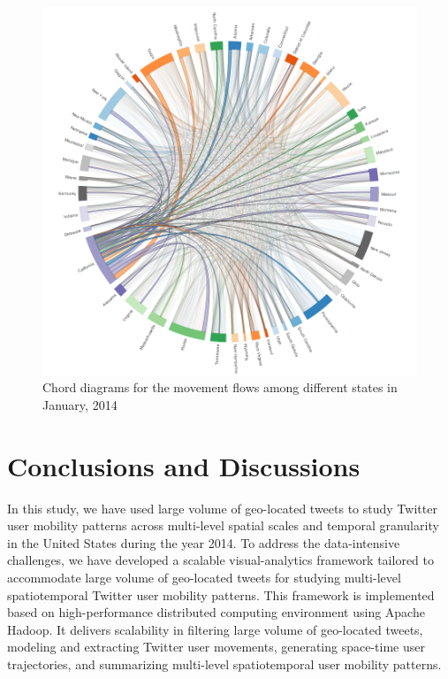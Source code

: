 \documentclass[a4paper, 11pt]{article}
\begin{document}
\begin{figure}[h]
\centering
\includegraphics[width=0.9\linewidth]{./figures/vaca_flow}
\caption{Chord diagrams for the movement flows among different states in January, 2014}
\label{fig:vaca_movement}
\end{figure}
\FloatBarrier




\section{Conclusions and Discussions}
In this study, we have used large volume of geo-located tweets to study Twitter user mobility patterns across multi-level spatial scales and temporal granularity in the United States during the year 2014. 
To address the data-intensive challenges, we have developed a scalable visual-analytics framework tailored to accommodate large volume of geo-located tweets for studying multi-level spatiotemporal Twitter user mobility patterns.
This framework is implemented based on high-performance distributed computing environment using Apache Hadoop.
It delivers scalability in filtering large volume of geo-located tweets, modeling and extracting Twitter user movements, generating space-time user trajectories, and summarizing multi-level spatiotemporal user mobility patterns.
\end{document}
